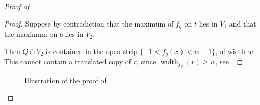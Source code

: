\documentclass{amsart}
\theoremstyle{plain}
\theoremstyle{definition}
\newcommand{\width}{\operatorname{width}}
\newcommand{\Giulia}[1]{\todo[size=\tiny,inline,color=blue!30]{#1 \\ \hfill --- G.}}
\begin{document}
\begin{proof}[Proof of ]
\begin{proof}
Suppose by contradiction that the maximum of $f_q$ on $t$  lies in $V_1$ and that the maximum on $b$ lies in $V_2$. 

Then $Q \cap V_2$ is contained in the open strip $\{-1<f_q(x)<w-1\}$, of width $w$. This cannot contain a translated copy of $r$, since $\width_{f_q}(r) \geq w$, see  .
\end{proof}

\begin{figure}[htb]
\scalebox{.75}{}
\caption{Illustration of the proof of }
\label{fig:claim2}
\end{figure}

%
%
%
%
%
%
%
%
%

\end{proof}
\end{document}
